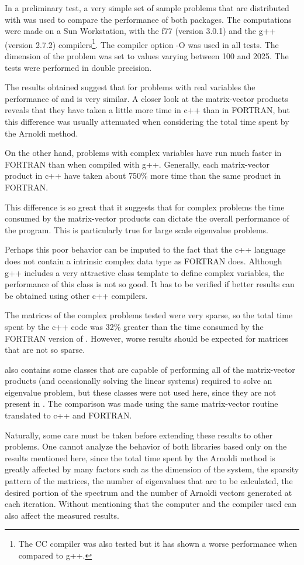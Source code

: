 In a preliminary test, a very simple set of sample problems that are distributed with \ARP{} was used to compare the performance of both packages. The computations were made on a Sun Workstation, with the f77 (version 3.0.1) and the g++ (version 2.7.2) compilers\footnote{The CC compiler was also tested but it has shown a worse performance when compared to g++.}. The compiler option -O was used in all tests. The dimension of the problem was set to values varying between 100 and 2025. The tests were performed in double precision.

The results obtained suggest that for problems with real variables the performance of \ARP{} and \ARPP{} is very similar. A closer look at the matrix-vector products reveals that they have taken a little more time in c++ than in FORTRAN, but this difference was usually attenuated when considering the total time spent by the Arnoldi method.

On the other hand, problems with complex variables have run much faster in FORTRAN than when compiled with g++. Generally, each matrix-vector product in c++ have taken about 750\% more time than the same product in FORTRAN.

This difference is so great that it suggests that for complex problems the time consumed by the matrix-vector products can dictate the overall performance of the program. This is particularly true for large scale eigenvalue problems.

Perhaps this poor behavior can be imputed to the fact that the c++ language does not contain a intrinsic complex data type as FORTRAN does. Although g++ includes a very attractive class template to define complex variables, the performance of this class is not so good. It has to be verified if better results can be obtained using other c++ compilers.

The matrices of the complex problems tested were very sparse, so the total time spent by the c++ code was 32\% greater than the time consumed by the FORTRAN version of \ARP{}. However, worse results should be expected for matrices that are not so sparse.

\ARPP{} also contains some classes that are capable of performing all of the matrix-vector products (and occasionally solving the linear systems) required to solve an eigenvalue problem, but these classes were not used here, since they are not present in \ARP{}. The comparison was made using the same matrix-vector routine translated to c++ and FORTRAN.

Naturally, some care must be taken before extending these results to other problems. One cannot analyze the behavior of both libraries based only on the results mentioned here, since the total time spent by the Arnoldi method is greatly affected by many factors such as the dimension of the system, the sparsity pattern of the matrices, the number of eigenvalues that are to be calculated, the desired portion of the spectrum and the number of Arnoldi vectors generated at each iteration. Without mentioning that the computer and the compiler used can also affect the measured results. 